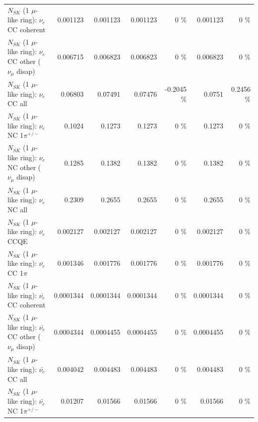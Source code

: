 \begin{table}
\begin{tabular}{| l | r | r | r  r | r  r |}
                               $N_{SK}$ (1 $\mu$-like ring): $\nu_e$ CC coherent &        0.001123 &        0.001123 &        0.001123 &        0 \%  &        0.001123 &        0 \%  \\ 
                $N_{SK}$ (1 $\mu$-like ring): $\nu_e$ CC other ($\nu_\mu$ disap) &        0.006715 &        0.006823 &        0.006823 &        0 \%  &        0.006823 &        0 \%  \\ 
                                  $N_{SK}$ (1 $\mu$-like ring): $\nu_{e}$ CC all &         0.06803 &         0.07491 &         0.07476 &  -0.2045 \%  &          0.0751 &   0.2456 \%  \\ 
\hline
                           $N_{SK}$ (1 $\mu$-like ring): $\nu_e$ NC 1$\pi^{+/-}$ &          0.1024 &          0.1273 &          0.1273 &        0 \%  &          0.1273 &        0 \%  \\ 
                $N_{SK}$ (1 $\mu$-like ring): $\nu_e$ NC other ($\nu_\mu$ disap) &          0.1285 &          0.1382 &          0.1382 &        0 \%  &          0.1382 &        0 \%  \\ 
                                  $N_{SK}$ (1 $\mu$-like ring): $\nu_{e}$ NC all &          0.2309 &          0.2655 &          0.2655 &        0 \%  &          0.2655 &        0 \%  \\ 
\hline
\hline
\hline
                                $N_{SK}$ (1 $\mu$-like ring): $\bar{\nu_e}$ CCQE &        0.002127 &        0.002127 &        0.002127 &        0 \%  &        0.002127 &        0 \%  \\ 
                           $N_{SK}$ (1 $\mu$-like ring): $\bar{\nu_e}$ CC 1$\pi$ &        0.001346 &        0.001776 &        0.001776 &        0 \%  &        0.001776 &        0 \%  \\ 
                         $N_{SK}$ (1 $\mu$-like ring): $\bar{\nu_e}$ CC coherent &       0.0001344 &       0.0001344 &       0.0001344 &        0 \%  &       0.0001344 &        0 \%  \\ 
          $N_{SK}$ (1 $\mu$-like ring): $\bar{\nu_e}$ CC other ($\nu_\mu$ disap) &       0.0004344 &       0.0004455 &       0.0004455 &        0 \%  &       0.0004455 &        0 \%  \\ 
                            $N_{SK}$ (1 $\mu$-like ring): $\bar{\nu_{e}}$ CC all &        0.004042 &        0.004483 &        0.004483 &        0 \%  &        0.004483 &        0 \%  \\ 
\hline
                     $N_{SK}$ (1 $\mu$-like ring): $\bar{\nu_e}$ NC 1$\pi^{+/-}$ &         0.01207 &         0.01566 &         0.01566 &        0 \%  &         0.01566 &        0 \%  \\ 

\end{tabular}
\end{table}
